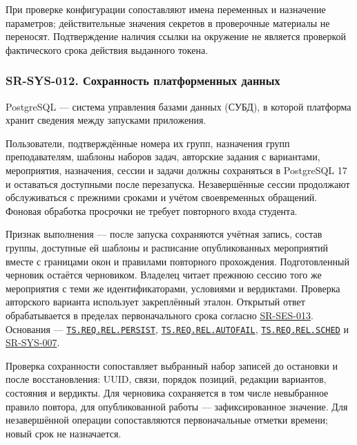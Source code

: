 \documentclass[12pt,a4paper]{article}
\begin{document}
При проверке конфигурации сопоставляют имена переменных и назначение параметров; действительные значения секретов в проверочные материалы не переносят. Подтверждение наличия ссылки на окружение не является проверкой фактического срока действия выданного токена.

\subsubsection{SR-SYS-012. Сохранность платформенных данных}\label{sr-sys-012-ux441ux43eux445ux440ux430ux43dux43dux43eux441ux442ux44c-ux43fux43bux430ux442ux444ux43eux440ux43cux435ux43dux43dux44bux445-ux434ux430ux43dux43dux44bux445}

\hypertarget{sr-sys-012-сохранность-платформенных-данных}{}

\hypertarget{sr-sys-012}{}

PostgreSQL --- система управления базами данных (СУБД), в которой платформа хранит сведения между запусками приложения.

Пользователи, подтверждённые номера их групп, назначения групп преподавателям, шаблоны наборов задач, авторские задания с вариантами, мероприятия, назначения, сессии и задачи должны сохраняться в PostgreSQL 17 и оставаться доступными после перезапуска. Незавершённые сессии продолжают обслуживаться с прежними сроками и учётом своевременных обращений. Фоновая обработка просрочки не требует повторного входа студента.

Признак выполнения --- после запуска сохраняются учётная запись, состав группы, доступные ей шаблоны и расписание опубликованных мероприятий вместе с границами окон и правилами повторного прохождения. Подготовленный черновик остаётся черновиком. Владелец читает прежнюю сессию того же мероприятия с теми же идентификаторами, условиями и вердиктами. Проверка авторского варианта использует закреплённый эталон. Открытый ответ обрабатывается в пределах первоначального срока согласно {\hyperlink{sr-ses-013}{SR-SES-013}}. Основания --- {\href{../02\_Техническое\_задание/Техническое\_задание.pdf\#ts-req-rel-persist}{\texttt{TS.\allowbreak{}REQ.\allowbreak{}REL.\allowbreak{}PERSIST}}}, {\href{../02\_Техническое\_задание/Техническое\_задание.pdf\#ts-req-rel-autofail}{\texttt{TS.\allowbreak{}REQ.\allowbreak{}REL.\allowbreak{}AUTOFAIL}}}, {\href{../02\_Техническое\_задание/Техническое\_задание.pdf\#ts-req-rel-sched}{\texttt{TS.\allowbreak{}REQ.\allowbreak{}REL.\allowbreak{}SCHED}}} и {\hyperlink{sr-sys-007}{SR-SYS-007}}.

Проверка сохранности сопоставляет выбранный набор записей до остановки и после восстановления: UUID, связи, порядок позиций, редакции вариантов, состояния и вердикты. Для черновика сохраняется в том числе невыбранное правило повтора, для опубликованной работы --- зафиксированное значение. Для незавершённой операции сопоставляются первоначальные отметки времени; новый срок не назначается.
\end{document}

